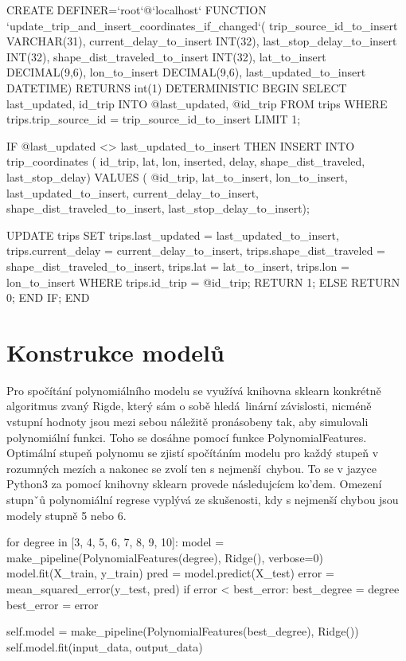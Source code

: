 \begin{code}[frame=none]
CREATE DEFINER=`root`@`localhost` FUNCTION
  `update_trip_and_insert_coordinates_if_changed`(
  trip_source_id_to_insert VARCHAR(31),
  current_delay_to_insert INT(32),
    last_stop_delay_to_insert INT(32),
  shape_dist_traveled_to_insert INT(32),
  lat_to_insert DECIMAL(9,6),
  lon_to_insert DECIMAL(9,6),
  last_updated_to_insert DATETIME) RETURNS int(1)
    DETERMINISTIC
BEGIN
  SELECT last_updated, id_trip
  INTO @last_updated, @id_trip
  FROM trips
  WHERE trips.trip_source_id = trip_source_id_to_insert
  LIMIT 1;

  IF @last_updated <> last_updated_to_insert THEN
    INSERT INTO trip_coordinates (
      id_trip,
      lat,
      lon,
      inserted,
      delay,
      shape_dist_traveled,
      last_stop_delay)
    VALUES (
      @id_trip,
      lat_to_insert,
      lon_to_insert,
      last_updated_to_insert,
      current_delay_to_insert,
      shape_dist_traveled_to_insert,
      last_stop_delay_to_insert);

    UPDATE trips
    SET trips.last_updated = last_updated_to_insert,
      trips.current_delay = current_delay_to_insert,
      trips.shape_dist_traveled = shape_dist_traveled_to_insert,
      trips.lat = lat_to_insert,
      trips.lon = lon_to_insert
    WHERE trips.id_trip = @id_trip;
        RETURN 1;
  ELSE
    RETURN 0;
  END IF;
END
\end{code}


\section{Konstrukce modelů}

Pro spočítání polynomiálního modelu se využívá knihovna sklearn konkrétně algoritmus zvaný Rigde, který sám o sobě hledá linární závislosti, nicméně vstupní hodnoty jsou mezi sebou náležitě pronásobeny tak, aby simulovali polynomiální funkci. Toho se dosáhne pomocí funkce PolynomialFeatures. Optimální stupeň polynomu se zjistí spočítáním modelu pro každý stupeň v rozumných mezích a nakonec se zvolí ten s nejmenší chybou. To se v jazyce Python3 za pomocí knihovny sklearn provede následujcícm ko'dem. Omezení stupnˇů polynomiální regrese vyplývá ze skušenosti, kdy s nejmenší chybou jsou modely stupně 5 nebo 6.

\begin{code}[frame=none]
for degree in [3, 4, 5, 6, 7, 8, 9, 10]:
  model = make_pipeline(PolynomialFeatures(degree), Ridge(), verbose=0)
  model.fit(X_train, y_train)
  pred = model.predict(X_test)
  error = mean_squared_error(y_test, pred)
  if error < best_error:
    best_degree = degree
    best_error = error

self.model = make_pipeline(PolynomialFeatures(best_degree), Ridge())
self.model.fit(input_data, output_data)
\end{code}

